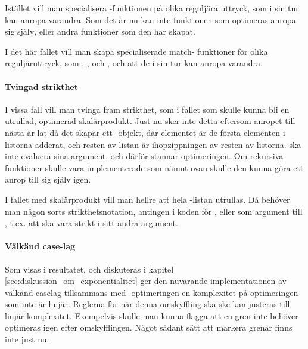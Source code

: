 \documentclass[Rapport]{subfiles}
\begin{document}
    Istället vill man specialisera -funktionen på olika reguljära uttryck,
som i sin tur kan anropa varandra. Som det är nu kan inte funktionen som
optimeras anropa sig själv, eller andra funktioner som den har skapat.

    I det här fallet vill man skapa specialiserade match-
funktioner för olika reguljäruttryck, 
som , ,  och , och att de i sin tur
kan anropa varandra.

\paragraph{Tvingad strikthet}
I vissa fall vill man tvinga fram strikthet, som i fallet 
 som skulle kunna bli en utrullad,
optimerad skalärprodukt. Just nu sker inte detta eftersom anropet till nästa
 är lat då det skapar ett -objekt, där elementet är de första
elementen i listorna adderat, och resten av listan är ihopzippningen av resten
av listorna.  ska inte evaluera sina argument, och därför stannar
optimeringen. Om rekursiva funktioner skulle vara implementerade som nämnt ovan
skulle den kunna göra ett anrop till sig själv igen.

    I fallet med skalärprodukt vill man hellre att hela -listan 
utrullas. Då behöver man någon sorts strikthetsnotation, antingen i koden 
för , eller som argument till , t.ex. att  ska vara strikt i 
sitt andra argument.

\paragraph{Välkänd case-lag}
Som visas i resultatet, och diskuteras i kapitel
\ref{sec:diskussion_om_exponentialitet} ger den nuvarande implementationen
av välkänd caselag tillsammans med -optimeringen 
en komplexitet på optimeringen som inte är linjär. Reglerna för när denna
omskyffling ska ske kan justeras till linjär komplexitet. Exempelvis skulle man
kunna flagga att en gren inte behöver optimeras igen efter omskyfflingen. 
Något sådant sätt att markera grenar finns inte just nu.
\end{document}
